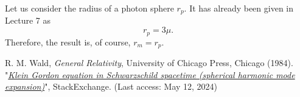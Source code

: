 \documentclass[a4paper,pdftex,10pt]{article}
\begin{document}
\begin{enumerate}
  Let us consider the radius of a photon sphere $r_{p}$. It has already been given in Lecture 7 as 
  \begin{equation}
    r_{p}
    =
    3\mu
    .
  \end{equation}
  Therefore, the result is, of course, $r_{m}=r_{p}$.

\end{enumerate}

\begin{thebibliography}{99}
  R. M. Wald, \textit{General Relativity}, University of Chicago Press, Chicago (1984).
  "\href{https://physics.stackexchange.com/questions/313336/klein-gordon-equation-in-schwarzschild-spacetime-spherical-harmonic-mode-expans}{\textit{Klein Gordon equation in Schwarzschild spacetime (spherical harmonic mode expansion)}}", StackExchange. (Last access: May 12, 2024)
\end{thebibliography}












% 
% 

\end{document}
